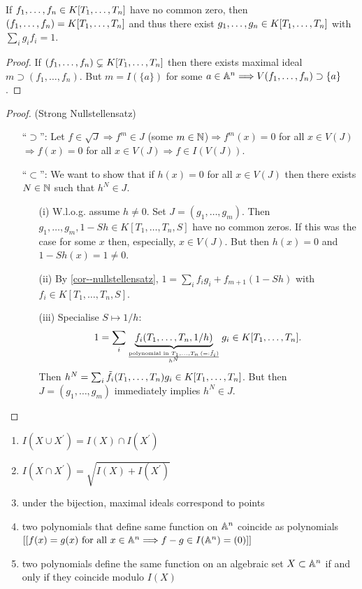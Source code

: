 \documentclass[a4paper,11pt]{article}
\begin{document}
			\begin{cor}\label{cor--nullstellensatz}
				If $f_1,\dots,f_n\in\K$ have no common zero, then $(f_1,\dots,f_n)=\K$ and thus there exist $g_1,\dots,g_n\in\K$ with $\sum_ig_if_i=1$.
			\end{cor}
			\begin{proof}
				If $(f_1,\dots,f_n)\subsetneq\K$ then there exists maximal ideal $m\supset(f_1,\dots,f_n)$. But $m=I(\{a\})$ for some $a\in\AA^n \Longrightarrow V(f_1,\dots,f_n)\supset\{a\}$ \contradiction.
			\end{proof}

			\begin{proof}
				(Strong Nullstellensatz) 
				\begin{enumerate}
					\item[``$\supset$'':] Let $f\in\sqrt{J}\Longrightarrow f^m\in J$ (some $m\in\N$)$\Longrightarrow f^m(x)=0$ for all $x\in V(J)$$\Longrightarrow f(x)=0$ for all $x\in V(J)$$\Longrightarrow f\in I(V(J))$.
					\item[``$\subset$'':] We want to show that if $h(x)=0$ for all $x\in V(J)$ then there exists $N\in\N$ such that $h^N\in J$.
					\begin{enumerate}
						\item[(i)] W.l.o.g. assume $h\neq0.$ Set $J=(g_1,\dots,g_m)$. Then $g_1,\dots,g_m,1-Sh\in K[T_1,\dots,T_n,S]$ have no common zeros. If this was the case for some $x$ then, especially, $x\in V(J)$. But then $h(x)=0$ and $1-Sh(x)=1\neq0$.
						\item[(ii)] By \autoref{cor--nullstellensatz}, $1=\sum_if_ig_i+f_{m+1}(1-Sh)$ with $f_i\in K[T_1,\dots,T_n,S]$.
						\item[(iii)] Specialise $S\mapsto 1/h$:\begin{equation*}
							1=\sum_i\underbrace{f_i(T_1,\dots,T_n,1/h)}_{\frac{\text{polynomial in }T_1,\dots,T_n\,(=:\tilde{f}_i)}{h^N}}g_i\in\K.
						\end{equation*}
						Then $h^N=\sum_i\tilde{f}_i(T_1,\dots,T_n)g_i\in\K$. But then $J=(g_1,\dots,g_m)$ immediately implies $h^N\in J$.
					\end{enumerate}  
				\end{enumerate}
			\end{proof}

			\begin{cor}
				\begin{enumerate}
					\item $I(X\cup X^\prime)=I(X)\cap I(X^\prime)$
					\item $I(X\cap X^{\prime})=\sqrt{I(X)+I(X^{\prime})}$
					\item under the bijection, maximal ideals correspond to points 
					\item two polynomials that define same function on $\AA^n$ coincide  as polynomials\\$[[f(x)=g(x)\text{ for all }x\in\AA^n\Longrightarrow f-g\in I(\AA^n)=(0)]]$
					\item two polynomials define the same function on an algebraic set $X\subset\AA^n$ if and only if they coincide modulo $I(X)$
				\end{enumerate}
			\end{cor}	
\end{document}
